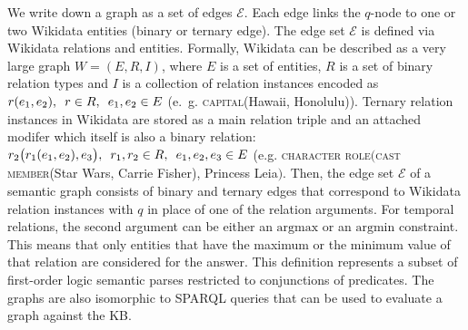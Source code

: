 \documentclass[11pt]{article}
\begin{document}
We write down a graph as a set of edges $\mathcal{E}$. Each edge links the $q$-node to one or two Wikidata entities (binary or ternary edge). The edge set $\mathcal{E}$ is defined via Wikidata relations and entities. Formally, Wikidata can be described as a very large graph $W = (E, R, I)$, where $E$ is a set of entities, $R$ is a set of binary relation types and $I$ is a collection of relation instances encoded as $r(e_1, e_2), \hspace{0.5em}r \in R, \hspace{0.5em}e_1,e_2 \in E$ (e.~g. \textsc{capital}\hspace{0.1em}({\small\sffamily Hawaii}, {\small\sffamily Honolulu})). Ternary relation instances in Wikidata are stored as a main relation triple and an attached modifer which itself is also a binary relation: $r_2\big(r_1(e_1, e_2), e_3\big), \hspace{0.5em}r_1, r_2 \in R, \hspace{0.5em}e_1,e_2,e_3 \in E$ (e.g. \textsc{character role}\hspace{0.1em}$\big($\textsc{cast member}\hspace{0.1em}({\small\sffamily Star Wars}, {\small\sffamily Carrie Fisher}), {\small\sffamily Princess Leia}$\big)$. Then, the edge set $\mathcal{E}$ of a semantic graph consists of binary and ternary edges that correspond to Wikidata relation instances with $q$ in place of one of the relation arguments. For temporal relations, the second argument can be either an $\mathrm{argmax}$ or an $\mathrm{argmin}$ constraint. This means that only entities that have the maximum or the minimum value of that relation are considered for the answer.
This definition represents a subset of first-order logic semantic parses restricted to conjunctions of predicates. The graphs are also isomorphic to SPARQL queries that can be used to evaluate a graph against the KB.
\end{document}
